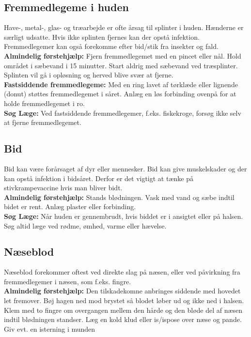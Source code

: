 \documentclass[../../../main.tex]{subfiles}
\begin{document}
\begin{multicols}{2}
\subsection*{Fremmedlegeme i huden} Have-, metal-, glas- og træarbejde er ofte årsag til splinter i huden. Hænderne er særligt udsatte. Hvis ikke splinten fjernes kan der opstå infektion. Fremmedlegemer kan også forekomme efter bid/stik fra insekter og fald.
\\

\textbf{Almindelig førstehjælp:} Fjern fremmedlegemet med en pincet eller nål.
Hold området i sæbevand i 15 minutter. Start aldrig med sæbevand ved træsplinter. Splinten vil gå i opløsning og herved blive svær at
fjerne.
\\

\textbf{Fastsiddende fremmedlegeme:} Med en ring lavet af tørklæde eller lignende (donut) støttes fremmedlegemet i såret. Anlæg en løs forbinding ovenpå for at holde fremmedlegemet i ro. 
\\

\textbf{Søg Læge:} Ved fastsiddende fremmedlegemer, f.eks. fiskekroge, forsøg ikke selv at fjerne fremmedlegemet. 
\\
\subsection*{Bid} Bid kan være forårsaget af dyr eller mennesker. Bid kan give muskelskader og der kan opstå infektion i bidsåret. Derfor er det vigtigt at tænke på stivkrampevaccine hvis man bliver bidt. 
\\

\textbf{Almindelig førstehjælp:} Stands blødningen. Vask med vand og sæbe indtil bidet er rent. Anlæg plaster eller forbinding.
\\

\textbf{Søg Læge:} Når huden er gennembrudt, hvis biddet er i ansigtet
eller på halsen. Søg altid læge ved rødme, ømhed, varme eller hævelse. 
\\

\subsection*{Næseblod}Næseblod forekommer oftest ved direkte slag på næsen, eller ved påvirkning fra fremmedlegemer i næsen, som f.eks. fingre.
\\

\textbf{Almindelig førstehjælp:} Den tilskadekomne anbringes siddende med
hovedet let fremover. Bøj hagen ned mod brystet så blodet løber ud og ikke ned i halsen. Klem med to fingre om overgangen mellem den hårde og den bløde del af næsen indtil blødningen standser. Læg en kold klud eller is/ispose over næse og pande. Giv evt. en isterning i munden
\\


\end{multicols}
\end{document}
